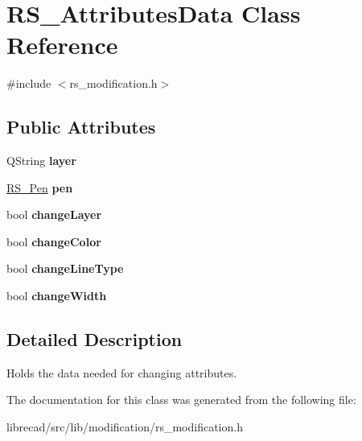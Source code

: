 \hypertarget{classRS__AttributesData}{\section{R\-S\-\_\-\-Attributes\-Data Class Reference}
\label{classRS__AttributesData}
}


{\ttfamily \#include $<$rs\-\_\-modification.\-h$>$}

\subsection*{Public Attributes}
\begin{DoxyCompactItemize}
\item 
\hypertarget{classRS__AttributesData_a5d18474d834fe8e8611c731c25318c46}{Q\-String {\bfseries layer}}\label{classRS__AttributesData_a5d18474d834fe8e8611c731c25318c46}

\item 
\hypertarget{classRS__AttributesData_ad5698762fc577fe21d95810a764a7ceb}{\hyperlink{classRS__Pen}{R\-S\-\_\-\-Pen} {\bfseries pen}}\label{classRS__AttributesData_ad5698762fc577fe21d95810a764a7ceb}

\item 
\hypertarget{classRS__AttributesData_a34c6ba92a8dc9ccc5b36cc25783b4e5f}{bool {\bfseries change\-Layer}}\label{classRS__AttributesData_a34c6ba92a8dc9ccc5b36cc25783b4e5f}

\item 
\hypertarget{classRS__AttributesData_a47363620577afc2522b61e2d172425e7}{bool {\bfseries change\-Color}}\label{classRS__AttributesData_a47363620577afc2522b61e2d172425e7}

\item 
\hypertarget{classRS__AttributesData_a7e9e2f7d03e3bd74f59af9fe0769f664}{bool {\bfseries change\-Line\-Type}}\label{classRS__AttributesData_a7e9e2f7d03e3bd74f59af9fe0769f664}

\item 
\hypertarget{classRS__AttributesData_a7094b45473a6f143a334394673dde55a}{bool {\bfseries change\-Width}}\label{classRS__AttributesData_a7094b45473a6f143a334394673dde55a}

\end{DoxyCompactItemize}


\subsection{Detailed Description}
Holds the data needed for changing attributes. 

The documentation for this class was generated from the following file\-:\begin{DoxyCompactItemize}
\item 
librecad/src/lib/modification/rs\-\_\-modification.\-h\end{DoxyCompactItemize}
